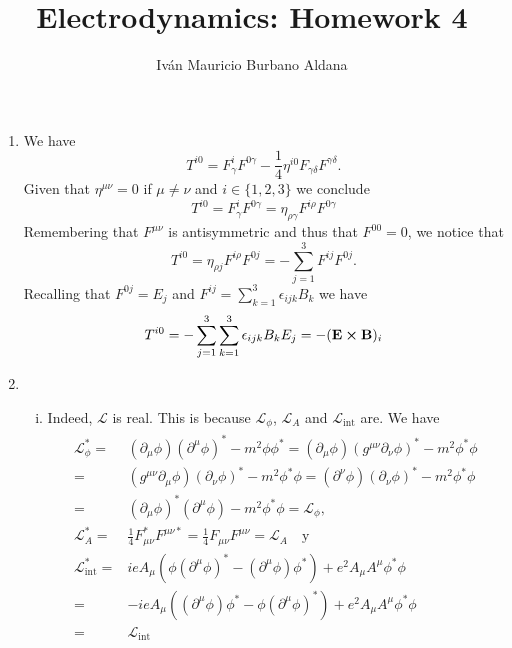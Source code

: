 \documentclass{article}
\title{Electrodynamics: Homework 4}
\author{Iván Mauricio Burbano Aldana}
\begin{document}
\maketitle

\begin{enumerate}

\item We have
\begin{equation}
T^{i0}=F^i_\gamma F^{0\gamma}-\frac{1}{4}\eta^{i0}F_{\gamma\delta}F^{\gamma\delta}.
\end{equation}
Given that $\eta^{\mu\nu}=0$ if $\mu\neq\nu$ and $i\in\{1,2,3\}$ we conclude
\begin{equation}
T^{i0}=F^i_\gamma F^{0\gamma}=\eta_{\rho\gamma}F^{i\rho}F^{0\gamma}
\end{equation}
Remembering that $F^{\mu\nu}$ is antisymmetric and thus that $F^{00}=0$, we notice that
\begin{equation}
T^{i0}=\eta_{\rho j}F^{i\rho}F^{0j}=-\sum_{j=1}^3F^{ij}F^{0j}.
\end{equation}
Recalling that $F^{0j}=E_j$ and $F^{ij}=\sum_{k=1}^3\epsilon_{ijk}B_k$ we have
\begin{equation}
T^{i0}=-\sum_{j=1}^3\sum_{k=1}^3\epsilon_{ijk}B_kE_j=-(\vb{E}\cross\vb{B})_i
\end{equation}

\item \begin{enumerate}[(i)]

\item Indeed, $\mathcal{L}$ is real. This is because $\mathcal{L}_\phi$, $\mathcal{L}_A$ and $\mathcal{L}_{\text{int}}$ are. We have
\begin{align}
\begin{split}
\mathcal{L}_\phi^*=&(\partial_\mu\phi)(\partial^\mu\phi)^*-m^2\phi\phi^*=(\partial_\mu\phi)(g^{\mu\nu}\partial_\nu\phi)^*-m^2\phi^*\phi\\
=&(g^{\mu\nu}\partial_\mu\phi)(\partial_\nu\phi)^*-m^2\phi^*\phi=(\partial^\nu\phi)(\partial_\nu\phi)^*-m^2\phi^*\phi\\
=&(\partial_\mu\phi)^*(\partial^\mu\phi)-m^2\phi^*\phi=\mathcal{L}_\phi,\\
\mathcal{L}_A^*=&\frac{1}{4}F_{\mu\nu}^*F^{\mu\nu*}=\frac{1}{4}F_{\mu\nu}F^{\mu\nu}=\mathcal{L}_A\quad\text{y}\\
\mathcal{L}_{\text{int}}^*=&ieA_\mu(\phi(\partial^\mu\phi)^*-(\partial^\mu\phi)\phi^*)+e^2A_\mu A^\mu\phi^*\phi\\
=&-ieA_\mu((\partial^\mu\phi)\phi^*-\phi(\partial^\mu\phi)^*)+e^2A_\mu A^\mu\phi^*\phi\\
=&\mathcal{L}_\text{int}
\end{split}
\end{align}


\end{enumerate}
\end{enumerate}
\end{document}
